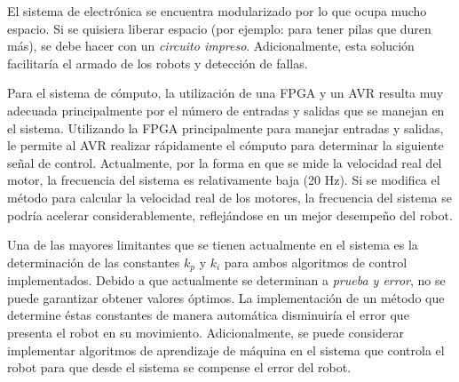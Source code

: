 El sistema de electrónica se encuentra modularizado por lo que ocupa mucho espacio. Si se quisiera liberar espacio (por ejemplo: para tener pilas que duren más), se debe hacer con un \textit{circuito impreso}. Adicionalmente, esta solución facilitaría el armado de los robots y detección de fallas. 


Para el sistema de cómputo, la utilización de una \gls{FPGA} y un \gls{AVR} resulta muy adecuada principalmente por el número de entradas y salidas que se manejan en el sistema. Utilizando la \gls{FPGA} principalmente para manejar entradas y salidas, le permite al \gls{AVR} realizar rápidamente el cómputo para determinar la siguiente señal de control. Actualmente, por la forma en que se mide la velocidad real del motor, la frecuencia del sistema es relativamente baja (20 Hz). Si se modifica el método para calcular la velocidad real de los motores, la frecuencia del sistema se podría acelerar considerablemente, reflejándose en un mejor desempeño del robot.


Una de las mayores limitantes que se tienen actualmente en el sistema es la determinación de las constantes $k_p$ y $k_i$ para ambos algoritmos de control implementados. Debido a que actualmente se determinan a \textit{prueba y error}, no se puede garantizar obtener valores óptimos. La implementación de un método que determine éstas constantes de manera automática disminuiría el error que presenta el robot en su movimiento. Adicionalmente, se puede considerar implementar algoritmos de aprendizaje de máquina en el sistema que controla el robot para que desde el sistema se compense el error del robot. 













